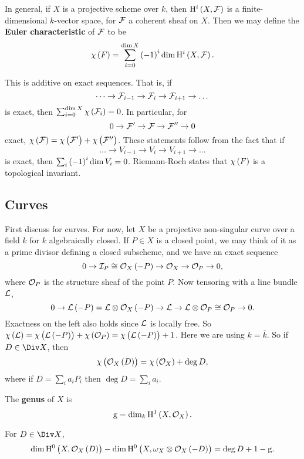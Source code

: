 \begin{definition*}
In general, if $ X $ is a projective scheme over $ k $, then $ \H^i\br{X, \FFF} $ is a finite-dimensional $ k $-vector space, for $ \mathcal{F} $ a coherent sheaf on $ X $. Then we may define the \textbf{Euler characteristic} of $ \mathcal{F} $ to be
$$ \chi\br{F} = \sum_{i = 0}^{\dim X} \br{-1}^i\dim \H^i\br{X, \FFF}. $$
\end{definition*}

This is additive on exact sequences. That is, if
$$ \dots \to \mathcal{F}_{i - 1} \to \mathcal{F}_i \to \mathcal{F}_{i + 1} \to \dots $$
is exact, then $ \sum_{i = 0}^{\dim X} \chi\br{\FFF_i} = 0 $. In particular, for
$$ 0 \to \mathcal{F}' \to \mathcal{F} \to \mathcal{F}'' \to 0 $$
exact, $ \chi\br{\FFF} = \chi\br{\FFF'} + \chi\br{\FFF''} $. These statements follow from the fact that if
$$ \dots \to V_{i - 1} \to V_i \to V_{i + 1} \to \dots $$
is exact, then $ \sum_i \br{-1}^i \dim V_i = 0 $. Riemann-Roch states that $ \chi\br{F} $ is a topological invariant.

\pagebreak

\subsection{Curves}

First discuss for curves. For now, let $ X $ be a projective non-singular curve over a field $ k $ for $ k $ algebraically closed. If $ P \in X $ is a closed point, we may think of it as a prime divisor defining a closed subscheme, and we have an exact sequence
$$ 0 \to \III_P \cong \OOO_X\br{-P} \to \OOO_X \to \OOO_P \to 0, $$
where $ \mathcal{O}_P $ is the structure sheaf of the point $ P $. Now tensoring with a line bundle $ \mathcal{L} $,
$$ 0 \to \LLL\br{-P} = \LLL \otimes \OOO_X\br{-P} \to \LLL \to \LLL \otimes \OOO_P \cong \OOO_P \to 0. $$
Exactness on the left also holds since $ \mathcal{L} $ is locally free. So $ \chi\br{\LLL} = \chi\br{\LLL\br{-P}} + \chi\br{\OOO_P} = \chi\br{\LLL\br{-P}} + 1 $. Here we are using $ k = \overline{k} $. So if $ D \in \Div X $, then
$$ \chi\br{\OOO_X\br{D}} = \chi\br{\OOO_X} + \deg D, $$
where if $ D = \sum_i a_iP_i $ then $ \deg D = \sum_i a_i $.

\begin{definition*}
The \textbf{genus} of $ X $ is
$$ \g = \dim_k \H^1\br{X, \OOO_X}. $$
\end{definition*}

\begin{theorem}
For $ D \in \Div X $,
\begin{equation}
\label{eq:2}
\dim \H^0\br{X, \OOO_X\br{D}} - \dim \H^0\br{X, \omega_X \otimes \OOO_X\br{-D}} = \deg D + 1 - \g.
\end{equation}
\end{theorem}

